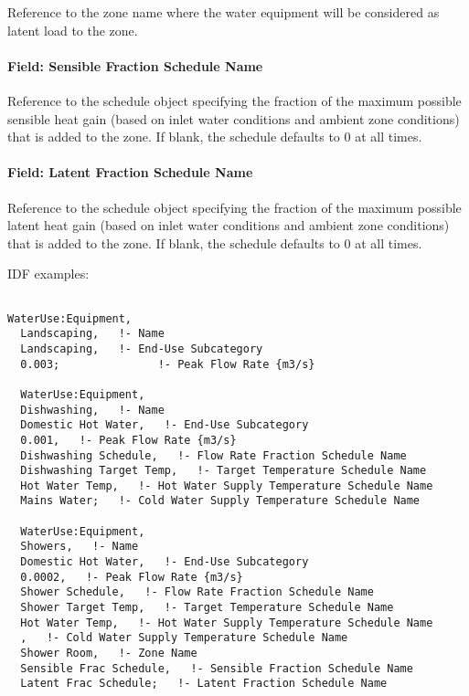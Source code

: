Reference to the zone name where the water equipment will be considered as latent load to the zone.

\paragraph{Field: Sensible Fraction Schedule Name}\label{field-sensible-fraction-schedule-name}

Reference to the schedule object specifying the fraction of the maximum possible sensible heat gain (based on inlet water conditions and ambient zone conditions) that is added to the zone. If blank, the schedule defaults to 0 at all times.

\paragraph{Field: Latent Fraction Schedule Name}\label{field-latent-fraction-schedule-name}

Reference to the schedule object specifying the fraction of the maximum possible latent heat gain (based on inlet water conditions and ambient zone conditions) that is added to the zone. If blank, the schedule defaults to 0 at all times.

IDF examples:

\begin{lstlisting}

WaterUse:Equipment,
  Landscaping,   !- Name
  Landscaping,   !- End-Use Subcategory
  0.003;               !- Peak Flow Rate {m3/s}

  WaterUse:Equipment,
  Dishwashing,   !- Name
  Domestic Hot Water,   !- End-Use Subcategory
  0.001,   !- Peak Flow Rate {m3/s}
  Dishwashing Schedule,   !- Flow Rate Fraction Schedule Name
  Dishwashing Target Temp,   !- Target Temperature Schedule Name
  Hot Water Temp,   !- Hot Water Supply Temperature Schedule Name
  Mains Water;   !- Cold Water Supply Temperature Schedule Name

  WaterUse:Equipment,
  Showers,   !- Name
  Domestic Hot Water,   !- End-Use Subcategory
  0.0002,   !- Peak Flow Rate {m3/s}
  Shower Schedule,   !- Flow Rate Fraction Schedule Name
  Shower Target Temp,   !- Target Temperature Schedule Name
  Hot Water Temp,   !- Hot Water Supply Temperature Schedule Name
  ,   !- Cold Water Supply Temperature Schedule Name
  Shower Room,   !- Zone Name
  Sensible Frac Schedule,   !- Sensible Fraction Schedule Name
  Latent Frac Schedule;   !- Latent Fraction Schedule Name
\end{lstlisting}

